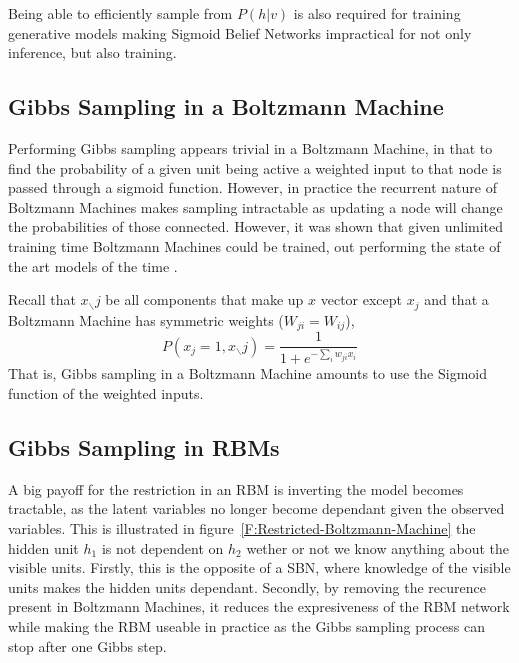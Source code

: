 Being able to efficiently sample from $P(h|v)$ is also required for training generative models making Sigmoid Belief Networks impractical for not only inference, but also training.




\subsection{Gibbs Sampling in a Boltzmann Machine}

Performing Gibbs sampling appears trivial in a Boltzmann Machine, in that to find the probability of a given unit being active a weighted input to that node is passed through a sigmoid function. However, in practice the recurrent nature of Boltzmann Machines makes sampling intractable as updating a node will change the probabilities of those connected. However, it was shown that given unlimited training time Boltzmann Machines could be trained, out performing the state of the art models of the time .

Recall that $ x_{\smallsetminus} j$ be all components that make up $x$ vector except $x_j$ and that a Boltzmann Machine has symmetric weights ($ W_{ji} = W_{ij} $),
$$
P(x_j = 1, x_{\smallsetminus}j) = \frac{1}{1 + e^{-\sum_i w_{ji}x_i}}
$$
That is, Gibbs sampling in a Boltzmann Machine amounts to use the Sigmoid function of the weighted inputs.

\subsection{Gibbs Sampling in RBMs}

A big payoff for the restriction in an RBM is inverting the model becomes tractable, as the latent variables no longer become dependant given the observed variables. This is illustrated in figure~\ref{F:Restricted-Boltzmann-Machine} the hidden unit $h_1$ is not dependent on $h_2$ wether or not we know anything about the visible units. Firstly, this is the opposite of a SBN, where knowledge of the visible units makes the hidden units dependant. Secondly, by removing the recurence present in Boltzmann Machines, it reduces the expresiveness of the RBM network while making the RBM useable in practice as the Gibbs sampling process can stop after one Gibbs step\todocite{}.

